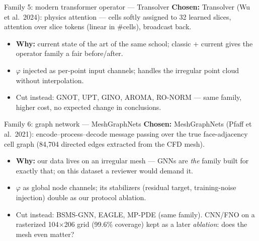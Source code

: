 \documentclass[10pt]{beamer}
\begin{document}
\begin{frame}{Family 5: modern transformer operator --- Transolver}
  \textbf{Chosen:} Transolver (Wu et al.\ 2024): physics attention --- cells softly assigned to
  32 learned slices, attention over slice tokens (linear in \#cells), broadcast back.
  \begin{itemize}
    \item \textbf{Why:} current state of the art of the same school; classic + current gives
          the operator family a fair before/after.
    \item $\varphi$ injected as per-point input channels; handles the irregular point cloud
          without interpolation.
    \item Cut instead: GNOT, UPT, GINO, AROMA, RO-NORM --- same family, higher cost,
          no expected change in conclusions.
  \end{itemize}
\end{frame}

\begin{frame}{Family 6: graph network --- MeshGraphNets}
  \textbf{Chosen:} MeshGraphNets (Pfaff et al.\ 2021): encode--process--decode message passing
  over the true face-adjacency cell graph (84{,}704 directed edges extracted from the CFD mesh).
  \begin{itemize}
    \item \textbf{Why:} our data lives on an irregular mesh --- GNNs are \emph{the} family built
          for exactly that; on this dataset a reviewer would demand it.
    \item $\varphi$ as global node channels; its stabilizers (residual target, training-noise
          injection) double as our protocol ablation.
    \item Cut instead: BSMS-GNN, EAGLE, MP-PDE (same family). CNN/FNO on a rasterized
          104$\times$206 grid (99.6\% coverage) kept as a later \emph{ablation}: does the
          mesh even matter?
  \end{itemize}
\end{frame}
\end{document}
